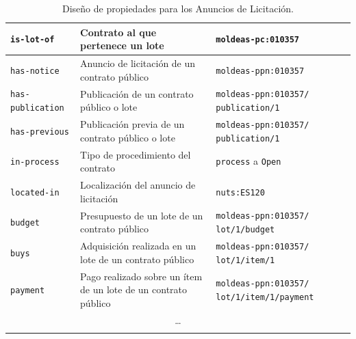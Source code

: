 \begin{longtable}[c]{|p{4.5cm}|p{4.5cm}|p{5cm}|}
  \texttt{is-lot-of} & Contrato al que pertenece un lote &  \texttt{moldeas-pc:010357}  \\ \hline
  \texttt{has-notice} & Anuncio de licitación de un contrato público &  \texttt{moldeas-ppn:010357} \\ \hline
  \texttt{has-publication} & Publicación de un contrato público o lote &  \texttt{moldeas-ppn:010357/ publication/1} \\ \hline
  \texttt{has-previous} & Publicación previa de un contrato público o lote &   \texttt{moldeas-ppn:010357/ publication/1} \\ \hline
  \texttt{in-process} & Tipo de procedimiento del contrato &  \texttt{process} a \texttt{Open} \\ \hline
  \texttt{located-in} & Localización del anuncio de licitación &  \texttt{nuts:ES120} \\ \hline
  \texttt{budget} & Presupuesto de un lote de un contrato público &  \texttt{moldeas-ppn:010357/ lot/1/budget} \\ \hline
  \texttt{buys} & Adquisición realizada en un lote de un contrato público &  \texttt{moldeas-ppn:010357/ lot/1/item/1} \\ \hline
  \texttt{payment} & Pago realizado sobre un ítem de un lote de un contrato público &  \texttt{moldeas-ppn:010357/ lot/1/item/1/payment} \\ \hline
  \multicolumn{3}{|c|}{\ldots} \\ \hline

\hline
\caption{Diseño de propiedades para los Anuncios de Licitación.}\label{table:ppn-rdf-model}\\    
\end{longtable}

